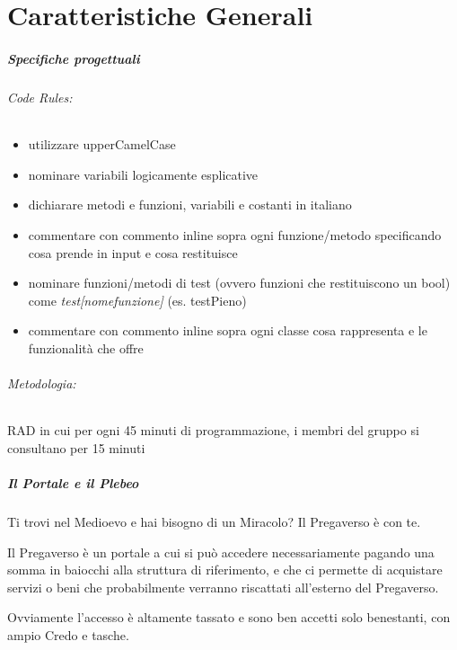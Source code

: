 \documentclass[a4paper]{report}
\author{}
\date{}
\begin{document}
    \chapter*{Caratteristiche Generali}

        \paragraph{Specifiche progettuali}
            \subparagraph{Code Rules:} 
            \begin{itemize}
                \item utilizzare upperCamelCase
                \item nominare variabili logicamente esplicative
                \item dichiarare metodi e funzioni, variabili e costanti in italiano
                \item commentare con commento inline sopra ogni funzione/metodo specificando cosa prende in input e cosa restituisce
                \item nominare funzioni/metodi di test (ovvero funzioni che restituiscono un bool) come \emph{test[nomefunzione]} (es. testPieno)
                \item commentare con commento inline sopra ogni classe cosa rappresenta e le funzionalità che offre
            \end{itemize}
        
            \subparagraph{Metodologia:} RAD in cui per ogni 45 minuti di programmazione, i membri del gruppo si consultano per 15 minuti

        \paragraph{Il Portale e il Plebeo}
        Ti trovi nel Medioevo e hai bisogno di un Miracolo? Il Pregaverso è con te.
        
        Il Pregaverso è un portale a cui si può accedere necessariamente pagando una somma in baiocchi alla struttura di riferimento, 
        e che ci permette di acquistare servizi o beni che probabilmente verranno riscattati all'esterno del Pregaverso.

        Ovviamente l'accesso è altamente tassato e sono ben accetti solo benestanti, con ampio Credo e tasche.
\end{document}
